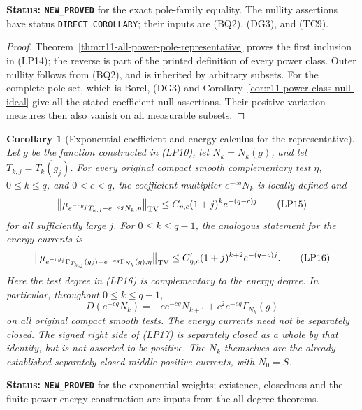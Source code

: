 \documentclass[11pt,a4paper]{article}
\numberwithin{equation}{section}
\newtheorem{corollary}[theorem]{Corollary}
\theoremstyle{definition}
\theoremstyle{remark}
\begin{document}
\noindent\textbf{Status: \texttt{NEW\_PROVED}} for the exact
pole-family equality. The nullity assertions have status
\texttt{DIRECT\_COROLLARY}; their inputs are (BQ2), (DG3), and (TC9).

\begin{proof}
Theorem~\ref{thm:r11-all-power-pole-representative} proves the
first inclusion in (LP14); the reverse is part of the printed
definition of every power class. Outer nullity follows from
(BQ2), and is inherited by arbitrary subsets. For the complete
pole set, which is Borel, (DG3) and
Corollary~\ref{cor:r11-power-class-null-ideal} give all the
stated coefficient-null assertions. Their positive variation
measures then also vanish on all measurable subsets.
\end{proof}

\begin{corollary}[Exponential coefficient and energy calculus for the representative]
\label{cor:r11-logarithmic-all-degree-exponential}
Let $g$ be the function constructed in (LP10), let
$N_k=N_k(g)$, and let $T_{k,j}=T_k(g_j)$.
For every original compact smooth complementary test $\eta$,
$0\leq k\leq q$, and $0<c<q$, the coefficient multiplier
$e^{-cg}N_k$ is locally defined and
\[
 \bigl\|\mu_{e^{-cg_j}T_{k,j}-e^{-cg}N_k,\eta}\bigr\|_{\rm TV}
       \leq C_{\eta,c}(1+j)^k e^{-(q-c)j}
 \tag{LP15}
\]
for all sufficiently large $j$. For $0\leq k\leq q-1$,
the analogous statement for the energy currents is
\[
 \bigl\|\mu_{e^{-cg_j}\Gamma_{T_{k,j}}(g_j)
                     -e^{-cg}\Gamma_{N_k}(g),\eta}\bigr\|_{\rm TV}
       \leq C'_{\eta,c}(1+j)^{k+2}e^{-(q-c)j}.
 \tag{LP16}
\]
Here the test degree in (LP16) is complementary to the energy
degree. In particular, throughout $0\leq k\leq q-1$,
\[
 D(e^{-cg}N_k)
      =-c e^{-cg}N_{k+1}
                          +c^2e^{-cg}\Gamma_{N_k}(g)
 \tag{LP17}
\]
on all original compact smooth tests. The energy currents need
not be separately closed. The signed right side of (LP17) is
separately closed as a whole by that identity, but is not
asserted to be positive. The $N_k$ themselves are the already established
separately closed middle-positive currents, with $N_0=S$.
\end{corollary}

\noindent\textbf{Status: \texttt{NEW\_PROVED}} for the
exponential weights; existence, closedness and the finite-power
energy construction are inputs from the all-degree theorems.
\end{document}
